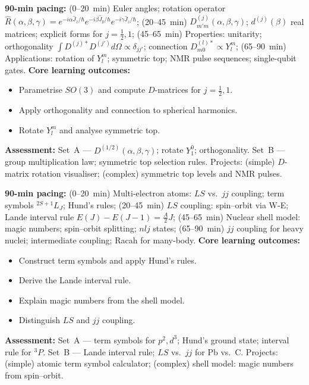 \documentclass[11pt,a4paper]{article}
\begin{document}
\medskip

\begin{tcolorbox}[modulebox, title={Module~II.3 / L10: Wigner $D$-matrices}]
\textbf{90-min pacing:} (0--20~min) Euler angles; rotation operator $\hat{R}(\alpha,\beta,\gamma)=e^{-i\alpha\hat{J}_z/\hbar}e^{-i\beta\hat{J}_y/\hbar}e^{-i\gamma\hat{J}_z/\hbar}$; (20--45~min) $D^{(j)}_{m'm}(\alpha,\beta,\gamma)$; $d^{(j)}(\beta)$ real matrices; explicit forms for $j=\tfrac{1}{2},1$; (45--65~min) Properties: unitarity; orthogonality $\int D^{(j)*}D^{(j')}d\Omega\propto\delta_{jj'}$; connection $D^{(l)*}_{m0}\propto Y_l^m$; (65--90~min) Applications: rotation of $Y_l^m$; symmetric top; NMR pulse sequences; single-qubit gates.
\medskip\textbf{Core learning outcomes:}
\begin{itemize}[leftmargin=1.4em,topsep=2pt,itemsep=1pt]
  \item Parametrise $SO(3)$ and compute $D$-matrices for $j=\tfrac{1}{2},1$.
  \item Apply orthogonality and connection to spherical harmonics.
  \item Rotate $Y_l^m$ and analyse symmetric top.
\end{itemize}
\medskip\textbf{Assessment:}
Set~A --- $D^{(1/2)}(\alpha,\beta,\gamma)$; rotate $Y_1^0$; orthogonality.
Set~B --- group multiplication law; symmetric top selection rules.
Projects: (simple) $D$-matrix rotation visualiser; (complex) symmetric top levels and NMR pulses.
\end{tcolorbox}

\medskip

\begin{tcolorbox}[modulebox, title={Module~II.3 / L11: Angular Momentum in Many-Body Systems}]
\textbf{90-min pacing:} (0--20~min) Multi-electron atoms: $LS$ vs.\ $jj$ coupling; term symbols $^{2S+1}L_J$; Hund's rules; (20--45~min) $LS$ coupling: spin--orbit via W-E; Lande interval rule $E(J)-E(J-1)=\tfrac{A}{2}J$; (45--65~min) Nuclear shell model: magic numbers; spin--orbit splitting; $nlj$ states; (65--90~min) $jj$ coupling for heavy nuclei; intermediate coupling; Racah for many-body.
\medskip\textbf{Core learning outcomes:}
\begin{itemize}[leftmargin=1.4em,topsep=2pt,itemsep=1pt]
  \item Construct term symbols and apply Hund's rules.
  \item Derive the Lande interval rule.
  \item Explain magic numbers from the shell model.
  \item Distinguish $LS$ and $jj$ coupling.
\end{itemize}
\medskip\textbf{Assessment:}
Set~A --- term symbols for $p^2,d^3$; Hund's ground state; interval rule for $^3P$.
Set~B --- Lande interval rule; $LS$ vs.\ $jj$ for Pb vs.\ C.
Projects: (simple) atomic term symbol calculator; (complex) shell model: magic numbers from spin--orbit.
\end{tcolorbox}
\end{document}
